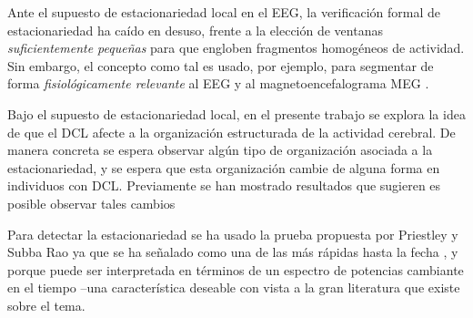\documentclass[12pt,letterpaper]{book}
\begin{document}

Ante el supuesto de estacionariedad local en el EEG, la verificación formal de estacionariedad ha caído en desuso, frente a la elección de ventanas \textit{suficientemente pequeñas} para que engloben fragmentos homogéneos de actividad.%
%
Sin embargo, el concepto como tal es usado, por ejemplo, para segmentar de forma \textit{fisiológicamente relevante} al EEG \cite{Kaplan99} y al magnetoencefalograma MEG \cite{lazyref1}.


Bajo el supuesto de estacionariedad local, en el presente trabajo se explora la idea de que el DCL afecte a la organización estructurada de la actividad cerebral.
%
De manera concreta se espera observar algún tipo de organización asociada a la estacionariedad, y se espera que esta organización cambie de alguna forma en individuos con DCL.
%
Previamente se han mostrado resultados que sugieren es posible observar tales cambios

Para detectar la estacionariedad se ha usado la prueba propuesta por Priestley y Subba Rao \cite{Priestley69} ya que se ha señalado como una de las más rápidas hasta la fecha \cite{Nason13}, y porque puede ser interpretada en términos de un espectro de potencias cambiante en el tiempo --una característica deseable con vista a la gran literatura que existe sobre el tema.


\end{document}
